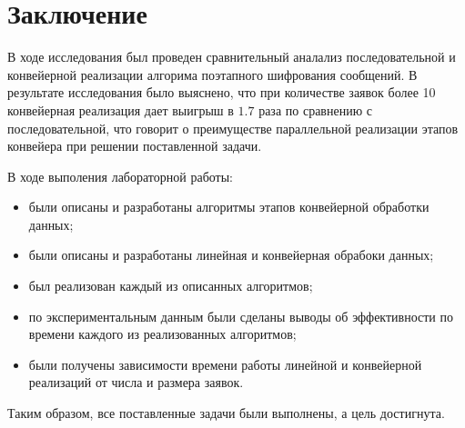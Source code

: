 \chapter*{Заключение}

В ходе исследования был проведен сравнительный аналализ последовательной и
конвейерной реализации алгорима поэтапного шифрования сообщений. В результате
исследования было выяснено, что при количестве заявок более 10 конвейерная
реализация дает выигрыш в $1.7$ раза по сравнению с последовательной, что 
говорит о преимуществе параллельной реализации этапов конвейера при решении
поставленной задачи.

В ходе выполения лабораторной работы:
\begin{itemize}[left=\parindent]
    \item были описаны и разработаны алгоритмы этапов конвейерной обработки данных;
    \item были описаны и разработаны линейная и конвейерная обрабоки данных;
    \item был реализован каждый из описанных алгоритмов;
    \item по экспериментальным данным были сделаны выводы об эффективности по
          времени каждого из реализованных алгоритмов;
    \item были получены зависимости времени работы линейной и конвейерной реализаций от числа и размера заявок.
\end{itemize}

Таким образом, все поставленные задачи были выполнены, а цель достигнута.
